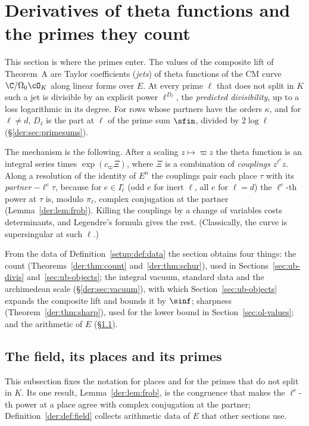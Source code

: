 \section{Derivatives of theta functions and the primes they count}\label{sec:der}

This section is where the primes enter. The values of the composite lift of Theorem~A are Taylor
coefficients (\emph{jets}) of theta functions of the CM curve $\C/\Omega_0\cO_K$ along linear forms
over $E$. At every prime $\ell$ that does not split in $K$ such a jet is divisible by an explicit
power $\ell^{D_\ell}$, the \emph{predicted divisibility}, up to a loss logarithmic in its degree.
For rows whose partners have the orders $\kappa$, and for $\ell\ne d$, $D_\ell$ is the part at
$\ell$ of the prime sum $\sfin$, divided by $2\log\ell$ (\S\ref{der:sec:primesums}).

The mechanism is the following. After a scaling $z\mapsto\varpi z$ the theta function is an
integral series times $\exp(c_\varpi\Xi)$, where $\Xi$ is a combination of \emph{couplings}
$z^{\ell^e}z$. Along a resolution of the identity of $E^n$ the couplings pair each place $\tau$
with its \emph{partner} $-\ell^e\tau$, because for $e\in I_\ell^\circ$ (odd $e$ for inert $\ell$,
all $e$ for $\ell=d$) the $\ell^e$-th power at $\tau$ is, modulo $\pi_\ell$, complex conjugation at
the partner (Lemma~\ref{der:lem:frob}). Killing the couplings by a change of variables costs
determinants, and Legendre's formula gives the rest. (Classically, the curve is supersingular at
such $\ell$.)

From the data of Definition~\ref{setup:def:data} the section obtains four things: the count
(Theorems~\ref{der:thm:count} and~\ref{der:thm:schur}), used in Sections~\ref{sec:ub-divis}
and~\ref{sec:ub-objects}; the integral vacuum, standard data and the archimedean scale
(\S\ref{der:sec:vacuum}), with which Section~\ref{sec:ub-objects} expands the composite lift and
bounds it by $\sinf$; sharpness (Theorem~\ref{der:thm:sharp}), used for the lower bound in
Section~\ref{sec:ol-values}; and the arithmetic of $E$ (\S\ref{der:sec:field}).

\subsection{The field, its places and its primes}\label{der:sec:field}

This subsection fixes the notation for places and for the primes that do not split in $K$. Its
one result, Lemma~\ref{der:lem:frob}, is the congruence that makes the $\ell^e$-th power at a place
agree with complex conjugation at the partner; Definition~\ref{der:def:field} collects arithmetic
data of $E$ that other sections use.

